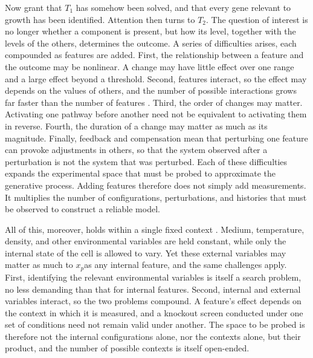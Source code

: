 \documentclass[twocolumn]{article} %
\begin{document}
Now grant that $T_1$ has somehow been solved, and that every gene relevant to growth has been identified. Attention then turns to $T_2$. The question of interest is no longer whether a component is present, but how its level, together with the levels of the others, determines the outcome. A series of difficulties arises, each compounded as features are added. First, the relationship between a feature and the outcome may be nonlinear. A change may have little effect over one range and a large effect beyond a threshold. Second, features interact, so the effect may depends on the values of others, and the number of possible interactions grows far faster than the number of features \citep[a]{domingo2019causes}. Third, the order of changes may matter. Activating one pathway before another need not be equivalent to activating them in reverse. Fourth, the duration of a change may matter as much as its magnitude. Finally, feedback and compensation mean that perturbing one feature can provoke adjustments in others, so that the system observed after a perturbation is not the system that was perturbed. Each of these difficulties expands the experimental space that must be probed to approximate the generative process. Adding features therefore does not simply add measurements. It multiplies the number of configurations, perturbations, and histories that must be observed to construct a reliable model.

All of this, moreover, holds within a single fixed context \citep[b]{domingo2019causes}. Medium, temperature, density, and other environmental variables are held constant, while only the internal state of the cell is allowed to vary. Yet these external variables may matter as much to $x_p$​ as any internal feature, and the same challenges apply. First, identifying the relevant environmental variables is itself a search problem, no less demanding than that for internal features. Second, internal and external variables interact, so the two problems compound. A feature's effect depends on the context in which it is measured, and a knockout screen conducted under one set of conditions need not remain valid under another. The space to be probed is therefore not the internal configurations alone, nor the contexts alone, but their product, and the number of possible contexts is itself open-ended.
\end{document}
